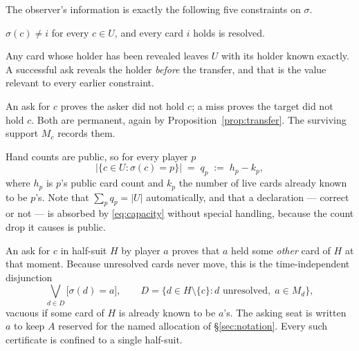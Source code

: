 The observer's information is exactly the following five constraints on
$\sigma$.

\begin{description}[style=unboxed,leftmargin=0pt,itemsep=4pt,parsep=0pt]
  \item[(C1) Own hand.] $\sigma(c) \ne i$ for every $c \in U$, and every card $i$
        holds is resolved.
  \item[(C2) Public transfers and correct declarations.] Any card whose holder
        has been revealed leaves $U$ with its holder known exactly. A successful
        ask reveals the holder \emph{before} the transfer, and that is the value
        relevant to every earlier constraint.
  \item[(C3) Exclusions.] An ask for $c$ proves the asker did not hold $c$; a
        miss proves the target did not hold $c$. Both are permanent, again by
        Proposition~\ref{prop:transfer}. The surviving support $M_c$ records
        them.
  \item[(C4) Capacities.] Hand counts are public, so for every player $p$
        \begin{equation}
          \bigl|\{c \in U : \sigma(c) = p\}\bigr| \;=\; q_p \;:=\; h_p - k_p ,
          \label{eq:capacity}
        \end{equation}
        where $h_p$ is $p$'s public card count and $k_p$ the number of live cards
        already known to be $p$'s. Note that $\sum_p q_p = |U|$ automatically,
        and that a declaration --- correct or not --- is absorbed by
        \eqref{eq:capacity} without special handling, because the count drop it
        causes is public.
  \item[(C5) Ask legality.] An ask for $c$ in half-suit $H$ by player $a$ proves
        that $a$ held some \emph{other} card of $H$ at that moment. Because
        unresolved cards never move, this is the time-independent disjunction
        \begin{equation}
          \bigvee_{d \in D} \bigl[\sigma(d) = a\bigr],
          \qquad D = \{d \in H \setminus \{c\} : d \text{ unresolved},\; a \in M_d\},
          \label{eq:disj}
        \end{equation}
        vacuous if some card of $H$ is already known to be $a$'s. The asking seat
        is written $a$ to keep $A$ reserved for the named allocation of
        \S\ref{sec:notation}. Every such certificate is confined to a single
        half-suit.
\end{description}

